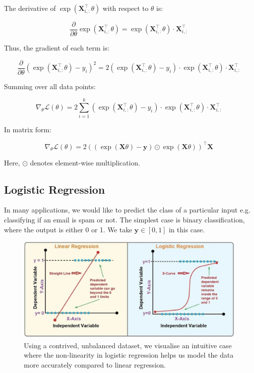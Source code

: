 The derivative of \(\exp(\bm{X}_{i,:}^\top \theta)\) with respect to \(\theta\) is:

\[
    \frac{\partial}{\partial \theta} \exp(\bm{X}_{i,:}^\top \theta) = \exp(\bm{X}_{i,:}^\top \theta) \cdot \bm{X}_{i,:}^\top
\]

Thus, the gradient of each term is:

\[
    \frac{\partial}{\partial \theta} \left( \exp(\bm{X}_{i,:}^\top \theta) - y_i \right)^2 = 2 (\exp(\bm{X}_{i,:}^\top \theta) - y_i) \cdot \exp(\bm{X}_{i,:}^\top \theta) \cdot \bm{X}_{i,:}^\top
\]

Summing over all data points:

\[
    \nabla_\theta \mathcal{L}(\theta) = 2 \sum_{i=1}^{k} (\exp(\bm{X}_{i,:}^\top \theta) - y_i) \cdot \exp(\bm{X}_{i,:}^\top \theta) \cdot \bm{X}_{i,:}^\top
\]

In matrix form:

\[
    \nabla_\theta \mathcal{L}(\theta) = 2 \left( (\exp(\bm{X}\theta) - \bm{y}) \odot \exp(\bm{X}\theta) \right)^\top \bm{X}
\]

Here, \(\odot\) denotes element-wise multiplication.

\subsection{Logistic Regression}
In many applications, we would like to predict the class of a particular input e.g. classifying if an email is spam or not. The simplest case is binary classification, where the output is either 0 or 1. We take $\bm{y} \in [0,1]$ in this case.

\begin{figure}[h!]
    \centering
    \includegraphics[width=1\textwidth]{img/3_lr_vs_logistic.png}
    \caption{Using a contrived, unbalanced dataset, we visualise an intuitive case where the non-linearity in  logistic regression helps us model the data more accurately compared to linear regression.}
\end{figure}


